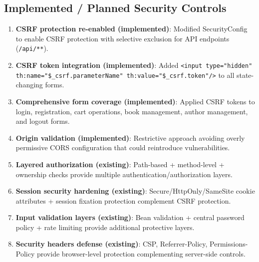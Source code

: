 \documentclass[]{UCD_CS_FYP_Report}
\begin{document}
\subsection*{Implemented / Planned Security Controls}
\begin{enumerate}
	\item \textbf{CSRF protection re-enabled (implemented)}: Modified SecurityConfig to enable CSRF protection with selective exclusion for API endpoints (\texttt{/api/**}).
	\item \textbf{CSRF token integration (implemented)}: Added \texttt{<input type="hidden" th:name="\${\_csrf.parameterName}" th:value="\${\_csrf.token}"/>} to all state-changing forms.
	\item \textbf{Comprehensive form coverage (implemented)}: Applied CSRF tokens to login, registration, cart operations, book management, author management, and logout forms.
	\item \textbf{Origin validation (implemented)}: Restrictive approach avoiding overly permissive CORS configuration that could reintroduce vulnerabilities.
	\item \textbf{Layered authorization (existing)}: Path-based + method-level + ownership checks provide multiple authentication/authorization layers.
	\item \textbf{Session security hardening (existing)}: Secure/HttpOnly/SameSite cookie attributes + session fixation protection complement CSRF protection.
	\item \textbf{Input validation layers (existing)}: Bean validation + central password policy + rate limiting provide additional protective layers.
	\item \textbf{Security headers defense (existing)}: CSP, Referrer-Policy, Permissions-Policy provide browser-level protection complementing server-side controls.
\end{enumerate}
\end{document}
